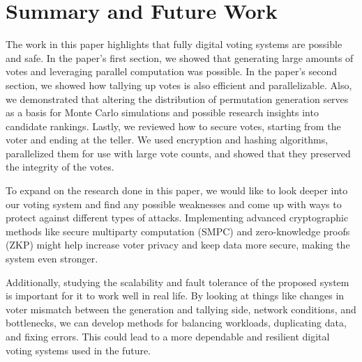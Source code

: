 \documentclass[final,5p,times,twocolumn,authoryear, 10pt]{elsarticle}
\begin{document}
\section{Summary and Future Work}
\label{Summary and Future Work}

The work in this paper highlights that fully digital voting systems are
possible and safe. In the paper's first section, we showed that generating
large amounts of votes and leveraging parallel computation was possible. In the
paper's second section, we showed how tallying up votes is also efficient and
parallelizable. Also, we demonstrated that altering the distribution of
permutation generation serves as a basis for Monte Carlo simulations and
possible research insights into candidate rankings. Lastly, we reviewed how to
secure votes, starting from the voter and ending at the teller. We used
encryption and hashing algorithms, parallelized them for use with large vote
counts, and showed that they preserved the integrity of the votes.

To expand on the research done in this paper, we would like to look deeper into
our voting system and find any possible weaknesses and come up with ways to
protect against different types of attacks. Implementing advanced cryptographic
methods like secure multiparty computation (SMPC) and zero-knowledge proofs
(ZKP) might help increase voter privacy and keep data more secure, making the
system even stronger.

Additionally, studying the scalability and fault tolerance of the proposed
system is important for it to work well in real life. By looking at things like
changes in voter mismatch between the generation and tallying side, network
conditions, and bottlenecks, we can develop methods for balancing workloads,
duplicating data, and fixing errors. This could lead to a more dependable and
resilient digital voting systems used in the future.
\end{document}
